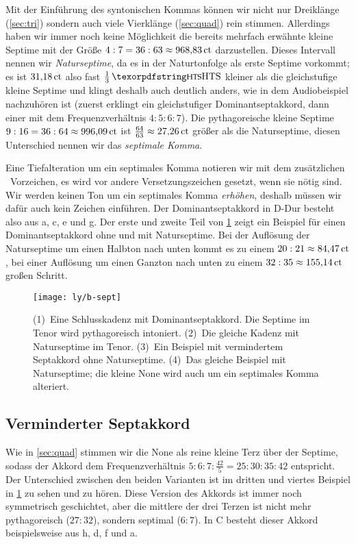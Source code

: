Mit der Einführung des syntonischen Kommas können wir nicht nur Dreiklänge
(\cref{sec:tri}) sondern auch viele Vierklänge (\cref{sec:quad}) rein stimmen.
Allerdings haben wir immer noch keine Möglichkeit die bereits mehrfach erwähnte
kleine Septime mit der Größe $4:7=36:63\approx 968{,}83\,\mathrm{ct}$ darzustellen.
Dieses Intervall nennen wir \emph{Naturseptime}, da es in der Naturtonfolge als
erste Septime vorkommt; es ist $31{,}18\,\mathrm{ct}$ also fast
$\frac13\,\text{\acr{HTS}}$ kleiner als die gleichstufige kleine Septime und
klingt deshalb auch deutlich anders, wie in dem Audiobeispiel nachzuhören
ist (zuerst erklingt ein gleichstufiger Dominantseptakkord, dann
einer mit dem Frequenzverhältnis $4:5:6:7$). Die pythagoreische kleine Septime
$9:16=36:64\approx 996{,}09\,\mathrm{ct}$ ist
$\frac{64}{63}\approx 27{,}26\,\mathrm{ct}$ größer als die Naturseptime, diesen
Unterschied nennen wir das \emph{septimale Komma}.

Eine Tiefalteration um ein septimales Komma notieren wir mit dem zusätzlichen
\septimal\ Vorzeichen, es wird vor andere Versetzungszeichen gesetzt, wenn sie
nötig sind. Wir werden keinen Ton um ein septimales Komma \emph{erhöhen},
deshalb müssen wir dafür auch kein Zeichen einführen. Der Dominantseptakkord in
D-Dur besteht also aus a, \sharpm c, e und \septimal g. Der erste und zweite
Teil von \cref{fig:sept} zeigt ein Beispiel für einen Dominantseptakkord ohne
und mit Naturseptime. Bei der Auflösung der Naturseptime um einen Halbton nach
unten kommt es zu einem $20:21\approx 84{,}47\,\mathrm{ct}$, bei einer Auflösung um
einen Ganzton nach unten zu einem $32:35\approx 155{,}14\,\mathrm{ct}$ großen
Schritt.

\begin{figure}
	\centering
	\texttt{[image: ly/b-sept]}
	\caption{(1)~Eine Schlusskadenz mit Dominantseptakkord. Die Septime im
		Tenor wird pythagoreisch intoniert.
		\quad(2)~Die gleiche Kadenz mit Naturseptime im Tenor.
		\quad(3)~Ein Beispiel mit vermindertem Septakkord ohne Naturseptime.
		\quad(4)~Das gleiche Beispiel mit Naturseptime; die kleine None wird
		auch um ein septimales Komma alteriert.}\label{fig:sept}
\end{figure}

\subsection{Verminderter Septakkord}

Wie in \cref{sec:quad} stimmen wir die None als reine kleine Terz über der
Septime, sodass der Akkord dem Frequenzverhältnis $5:6:7:\frac{42}5 = 25:30:35:42$
entspricht. Der Unterschied zwischen den beiden Varianten ist im dritten und
viertes Beispiel in \cref{fig:sept} zu sehen und zu hören. Diese Version des
Akkords ist immer noch symmetrisch geschichtet, aber die mittlere der drei
Terzen ist nicht mehr pythagoreisch ($27:32$), sondern septimal ($6:7$). In C besteht dieser Akkord beispielsweise aus \naturalm h, d, \septimal f und \septimal \flatp a.


